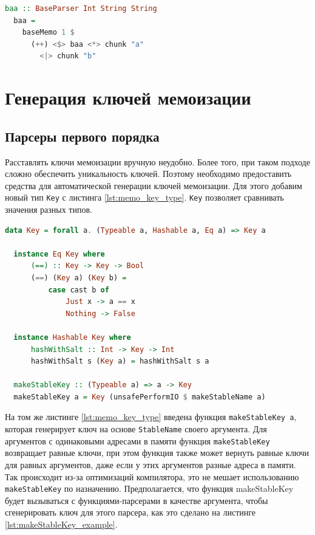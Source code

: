 \documentclass[times]{itmo-student-thesis}
\begin{document}
\begin{lstlisting}[language=Haskell,float=!h,caption={Парсер для строк $ba^*$},label={lst:baa_parser}]
  baa :: BaseParser Int String String
  baa =
    baseMemo 1 $
      (++) <$> baa <*> chunk "a"
        <|> chunk "b"
\end{lstlisting}

\section{Генерация ключей мемоизации}\label{sec:memoization_keys}

\subsection{Парсеры первого порядка}

Расставлять ключи мемоизации вручную неудобно. Более того, при таком подходе сложно обеспечить уникальность ключей. Поэтому
необходимо предоставить средства для автоматической генерации ключей мемоизации. Для этого добавим новый тип \lstinline{Key} 
с листинга \ref{lst:memo_key_type}. \lstinline{Key} позволяет сравнивать значения разных типов. 

\begin{lstlisting}[language=Haskell,float=!h,caption={Тип ключей мемоизации},label={lst:memo_key_type}]
  data Key = forall a. (Typeable a, Hashable a, Eq a) => Key a

  instance Eq Key where
      (==) :: Key -> Key -> Bool
      (==) (Key a) (Key b) =
          case cast b of
              Just x -> a == x
              Nothing -> False

  instance Hashable Key where
      hashWithSalt :: Int -> Key -> Int
      hashWithSalt s (Key a) = hashWithSalt s a

  makeStableKey :: (Typeable a) => a -> Key
  makeStableKey a = Key (unsafePerformIO $ makeStableName a)
\end{lstlisting}

На том же листинге \ref{lst:memo_key_type} введена функция \lstinline{makeStableKey a}, которая генерирует ключ на основе
\lstinline{StableName}\cite{noauthor_systemmemstablename_nodate}
своего аргумента. Для аргументов с одинаковыми адресами в памяти функция \lstinline{makeStableKey} возвращает равные ключи,
при этом функция также может вернуть равные ключи для равных аргументов, даже если у этих аргументов разные адреса в
памяти. Так происходит из-за оптимизаций компилятора, это не мешает использованию \lstinline{makeStableKey} по назначению.
Предполагается, что функция makeStableKey будет вызываться с функциями-парсерами в качестве аргумента, чтобы
сгенерировать ключ для этого парсера, как это сделано на листинге \ref{lst:makeStableKey_example}.
\end{document}
